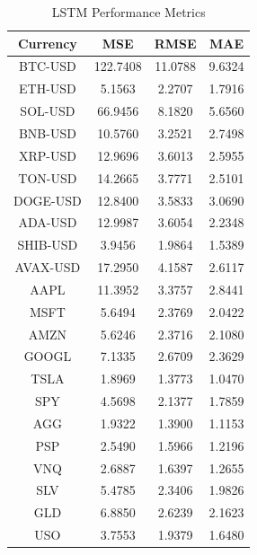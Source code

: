 \documentclass{ledger}
\begin{document}
\begin{table}[h]
\centering
\begin{tabular}{|c|c|c|c|}
\hline
\textbf{Currency} & \textbf{MSE} & \textbf{RMSE} & \textbf{MAE} \\ \hline
BTC-USD            & 122.7408     & 11.0788       & 9.6324       \\ \hline
ETH-USD            & 5.1563       & 2.2707        & 1.7916       \\ \hline
SOL-USD            & 66.9456      & 8.1820        & 5.6560       \\ \hline
BNB-USD            & 10.5760      & 3.2521        & 2.7498       \\ \hline
XRP-USD            & 12.9696      & 3.6013        & 2.5955       \\ \hline
TON-USD            & 14.2665      & 3.7771        & 2.5101       \\ \hline
DOGE-USD           & 12.8400      & 3.5833        & 3.0690       \\ \hline
ADA-USD            & 12.9987      & 3.6054        & 2.2348       \\ \hline
SHIB-USD           & 3.9456       & 1.9864        & 1.5389       \\ \hline
AVAX-USD           & 17.2950      & 4.1587        & 2.6117       \\ \hline
AAPL               & 11.3952      & 3.3757        & 2.8441       \\ \hline
MSFT               & 5.6494       & 2.3769        & 2.0422       \\ \hline
AMZN               & 5.6246       & 2.3716        & 2.1080       \\ \hline
GOOGL              & 7.1335       & 2.6709        & 2.3629       \\ \hline
TSLA               & 1.8969       & 1.3773        & 1.0470       \\ \hline
SPY                & 4.5698       & 2.1377        & 1.7859       \\ \hline
AGG                & 1.9322       & 1.3900        & 1.1153       \\ \hline
PSP                & 2.5490       & 1.5966        & 1.2196       \\ \hline
VNQ                & 2.6887       & 1.6397        & 1.2655       \\ \hline
SLV                & 5.4785       & 2.3406        & 1.9826       \\ \hline
GLD                & 6.8850       & 2.6239        & 2.1623       \\ \hline
USO                & 3.7553       & 1.9379        & 1.6480       \\ \hline

\end{tabular}
\caption{LSTM Performance Metrics}
\label{tab:crypto_metrics}
\end{table}
\end{document}
